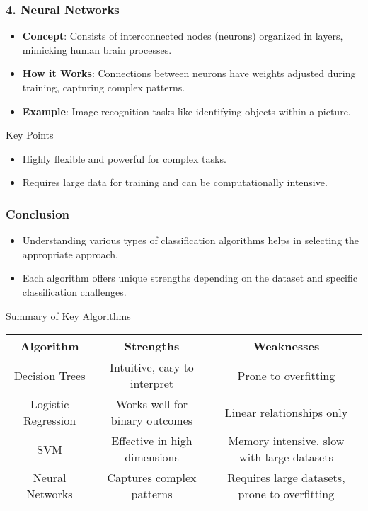 \documentclass{beamer}
\begin{document}
\begin{frame}[fragile]
    \frametitle{4. Neural Networks}
    \begin{itemize}
        \item \textbf{Concept}: Consists of interconnected nodes (neurons) organized in layers, mimicking human brain processes.
        \item \textbf{How it Works}: Connections between neurons have weights adjusted during training, capturing complex patterns.
        \item \textbf{Example}: Image recognition tasks like identifying objects within a picture.
    \end{itemize}
    
    \begin{block}{Key Points}
        \begin{itemize}
            \item Highly flexible and powerful for complex tasks.
            \item Requires large data for training and can be computationally intensive.
        \end{itemize}
    \end{block}
\end{frame}

\begin{frame}[fragile]
    \frametitle{Conclusion}
    \begin{itemize}
        \item Understanding various types of classification algorithms helps in selecting the appropriate approach.
        \item Each algorithm offers unique strengths depending on the dataset and specific classification challenges.
    \end{itemize}
    
    \begin{block}{Summary of Key Algorithms}
    \begin{tabular}{|c|c|c|}
        \hline
        \textbf{Algorithm} & \textbf{Strengths} & \textbf{Weaknesses} \\
        \hline
        Decision Trees & Intuitive, easy to interpret & Prone to overfitting \\
        Logistic Regression & Works well for binary outcomes & Linear relationships only \\
        SVM & Effective in high dimensions & Memory intensive, slow with large datasets \\
        Neural Networks & Captures complex patterns & Requires large datasets, prone to overfitting \\
        \hline
    \end{tabular}
    \end{block}
\end{frame}
\end{document}
